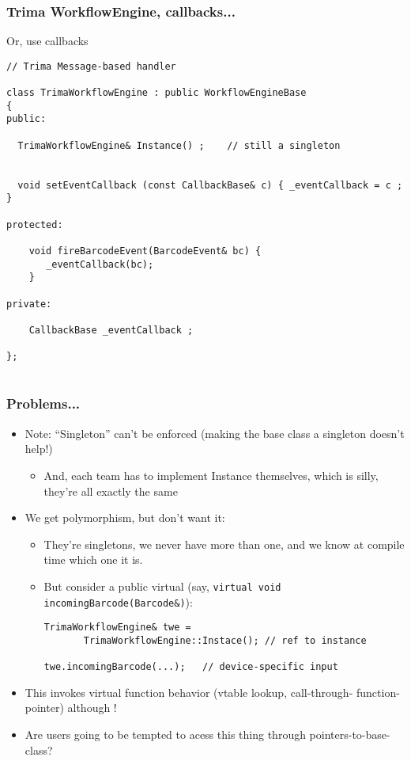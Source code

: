 \begin{frame}[fragile,t]
\frametitle{Trima WorkflowEngine, callbacks...}
Or, use callbacks
{\scriptsize
\begin{verbatim}
// Trima Message-based handler

class TrimaWorkflowEngine : public WorkflowEngineBase
{
public:

  TrimaWorkflowEngine& Instance() ;    // still a singleton


  void setEventCallback (const CallbackBase& c) { _eventCallback = c ; }  

protected:

    void fireBarcodeEvent(BarcodeEvent& bc) {
       _eventCallback(bc);
    }

private:

    CallbackBase _eventCallback ;

};


\end{verbatim}
}
\end{frame}

\begin{frame}[fragile,t]
\frametitle{Problems...}
\begin{itemize}[<+->]
\item Note: ``Singleton'' can't be enforced (making the base class a
  singleton doesn't help!)
  \begin{itemize}
    \item And, each team has to implement Instance themselves, which
      is silly, they're all exactly the same
  \end{itemize}
\item We get polymorphism, but don't want it:
  \begin{itemize}
    \item They're singletons, we never have more than one, and we know
      at compile time which one it is.
    \item But consider a public virtual (say, \texttt{virtual void
      incomingBarcode(Barcode\&)}):
{\scriptsize\begin{verbatim}
TrimaWorkflowEngine& twe = 
       TrimaWorkflowEngine::Instace(); // ref to instance

twe.incomingBarcode(...);   // device-specific input
\end{verbatim}
}

  \end{itemize}


\item This invokes virtual function behavior (vtable lookup,
  call-through- function-pointer) although !
\item Are users going to be tempted to acess this thing through
  pointers-to-base-class?
\end{itemize}

\end{frame}

